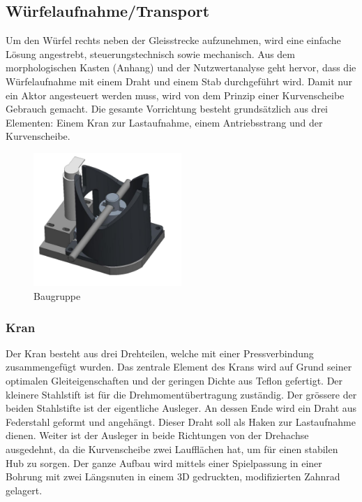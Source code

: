 \documentclass[../../main.tex]{subfiles}
\begin{document}
    \subsection{Würfelaufnahme/Transport}
         Um den Würfel rechts neben der Gleisstrecke aufzunehmen, wird eine einfache Lösung angestrebt, steuerungstechnisch sowie mechanisch. Aus dem morphologischen Kasten (Anhang) und der Nutzwertanalyse geht hervor, dass die Würfelaufnahme mit einem Draht und einem Stab durchgeführt wird. Damit nur ein Aktor angesteuert werden muss, wird von dem Prinzip einer Kurvenscheibe Gebrauch gemacht. Die gesamte Vorrichtung besteht grundsätzlich aus drei Elementen: Einem Kran zur Lastaufnahme, einem Antriebsstrang und der Kurvenscheibe.

        \begin{figure}[H]
            \centering
            \includegraphics[width=0.5\textwidth]{../../images/Kran/BG_3.JPG}
            \caption {Baugruppe}
        \end{figure}

    \subsubsection{Kran}
         Der Kran besteht aus drei Drehteilen, welche mit einer Pressverbindung zusammengefügt wurden. Das zentrale Element des Krans wird auf Grund seiner optimalen Gleiteigenschaften und der geringen Dichte aus Teflon gefertigt. Der kleinere Stahlstift ist für die Drehmomentübertragung zuständig. Der grössere der beiden Stahlstifte ist der eigentliche Ausleger. An dessen Ende wird ein Draht aus Federstahl geformt und angehängt. Dieser Draht soll als Haken zur Lastaufnahme dienen. Weiter ist der Ausleger in beide Richtungen von der Drehachse ausgedehnt, da die Kurvenscheibe zwei Laufflächen hat, um für einen stabilen Hub zu sorgen. Der ganze Aufbau wird mittels einer Spielpassung in einer Bohrung mit zwei Längsnuten in einem 3D gedruckten, modifizierten Zahnrad gelagert.
\end{document}
